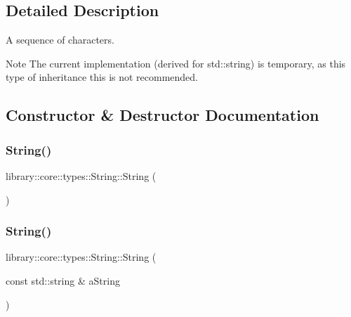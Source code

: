 \subsection{Detailed Description}
A sequence of characters. 

\begin{DoxyNote}{Note}
The current implementation (derived for std\+::string) is temporary, as this type of inheritance this is not recommended. 
\end{DoxyNote}


\subsection{Constructor \& Destructor Documentation}
\mbox{\label{classlibrary_1_1core_1_1types_1_1_string_ab49dec039a75f0049c95759141b6d484}} 
\subsubsection{\texorpdfstring{String()}{String()}\hspace{0.1cm}{\footnotesize\ttfamily [1/2]}}
{\footnotesize\ttfamily library\+::core\+::types\+::\+String\+::\+String (\begin{DoxyParamCaption}{ }\end{DoxyParamCaption})}

\mbox{\label{classlibrary_1_1core_1_1types_1_1_string_a37c737528805786c49eab397ba7b64ae}} 
\subsubsection{\texorpdfstring{String()}{String()}\hspace{0.1cm}{\footnotesize\ttfamily [2/2]}}
{\footnotesize\ttfamily library\+::core\+::types\+::\+String\+::\+String (\begin{DoxyParamCaption}\item[{const std\+::string \&}]{a\+String }\end{DoxyParamCaption})}

